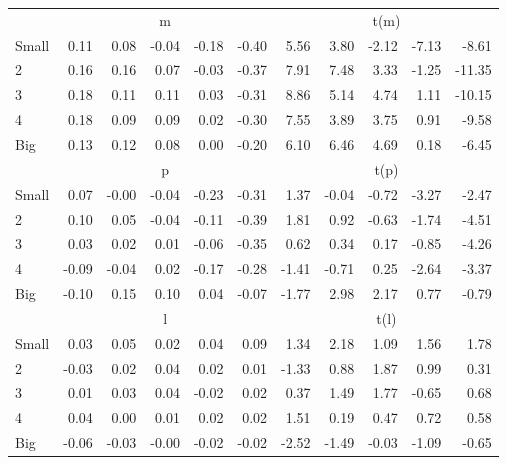 \begin{table}[!ht]
\begin{tabular}{lrrrrrrrrrr}
      & \multicolumn{5}{c}{m} & \multicolumn{5}{c}{t(m)}
    
    \\
      \cmidrule(r){2-6} \cmidrule(r){7-11}

    Small   & 0.11  & 0.08  & -0.04  & -0.18  & -0.40  & 5.56  & 3.80  & -2.12  & -7.13  & -8.61  \\
         2  & 0.16  & 0.16  & 0.07  & -0.03  & -0.37  & 7.91  & 7.48  & 3.33  & -1.25  & -11.35  \\
         3  & 0.18  & 0.11  & 0.11  & 0.03  & -0.31  & 8.86  & 5.14  & 4.74  & 1.11  & -10.15  \\
         4  & 0.18  & 0.09  & 0.09  & 0.02  & -0.30  & 7.55  & 3.89  & 3.75  & 0.91  & -9.58  \\
    Big     & 0.13  & 0.12  & 0.08  & 0.00  & -0.20  & 6.10  & 6.46  & 4.69  & 0.18  & -6.45  \\

  
    
      & \multicolumn{5}{c}{p} & \multicolumn{5}{c}{t(p)}
    
    \\
      \cmidrule(r){2-6} \cmidrule(r){7-11}

    Small   & 0.07  & -0.00  & -0.04  & -0.23  & -0.31  & 1.37  & -0.04  & -0.72  & -3.27  & -2.47  \\
         2  & 0.10  & 0.05  & -0.04  & -0.11  & -0.39  & 1.81  & 0.92  & -0.63  & -1.74  & -4.51  \\
         3  & 0.03  & 0.02  & 0.01  & -0.06  & -0.35  & 0.62  & 0.34  & 0.17  & -0.85  & -4.26  \\
         4  & -0.09  & -0.04  & 0.02  & -0.17  & -0.28  & -1.41  & -0.71  & 0.25  & -2.64  & -3.37  \\
    Big     & -0.10  & 0.15  & 0.10  & 0.04  & -0.07  & -1.77  & 2.98  & 2.17  & 0.77  & -0.79  \\

  
    
      & \multicolumn{5}{c}{l} & \multicolumn{5}{c}{t(l)}
    
    \\
      \cmidrule(r){2-6} \cmidrule(r){7-11}

    Small   & 0.03  & 0.05  & 0.02  & 0.04  & 0.09  & 1.34  & 2.18  & 1.09  & 1.56  & 1.78  \\
         2  & -0.03  & 0.02  & 0.04  & 0.02  & 0.01  & -1.33  & 0.88  & 1.87  & 0.99  & 0.31  \\
         3  & 0.01  & 0.03  & 0.04  & -0.02  & 0.02  & 0.37  & 1.49  & 1.77  & -0.65  & 0.68  \\
         4  & 0.04  & 0.00  & 0.01  & 0.02  & 0.02  & 1.51  & 0.19  & 0.47  & 0.72  & 0.58  \\
    Big     & -0.06  & -0.03  & -0.00  & -0.02  & -0.02  & -2.52  & -1.49  & -0.03  & -1.09  & -0.65  \\

  

  \bottomrule
\end{tabular}
\label{tbl:25_Size_Var_B2016b}
\end{table}